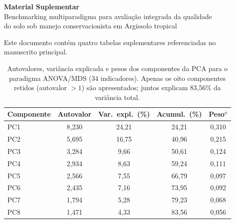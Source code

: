 \documentclass[12pt]{article}
\begin{document}
\begin{center}
{\Large\bfseries Material Suplementar}\\[6pt]
{\large Benchmarking multiparadigma para avaliação integrada da qualidade\\
do solo sob manejo conservacionista em Argissolo tropical}\\[12pt]
\end{center}

\noindent Este documento contém quatro tabelas suplementares referenciadas no manuscrito principal.

\clearpage
\begin{table}[ht]
\centering
\caption{Autovalores, variância explicada e pesos dos componentes da PCA para o paradigma ANOVA/MDS (34 indicadores). Apenas os oito componentes retidos (autovalor $> 1$) são apresentados; juntos explicam 83,56\% da variância total.}\label{tab:s1_eigen}
\begin{tabular}{lcccc}
\toprule
Componente & Autovalor & Var.\ expl.\ (\%) & Acumul.\ (\%) & Peso$^a$ \\
\midrule
PC1  & 8,230 & 24,21 & 24,21 & 0,310 \\
PC2  & 5,695 & 16,75 & 40,96 & 0,215 \\
PC3  & 3,284 & 9,66  & 50,61 & 0,124 \\
PC4  & 2,934 & 8,63  & 59,24 & 0,111 \\
PC5  & 2,566 & 7,55  & 66,79 & 0,097 \\
PC6  & 2,435 & 7,16  & 73,95 & 0,092 \\
PC7  & 1,794 & 5,28  & 79,23 & 0,068 \\
PC8  & 1,471 & 4,33  & 83,56 & 0,056 \\
\bottomrule
\end{tabular}
\smallskip

\end{table}
\end{document}
